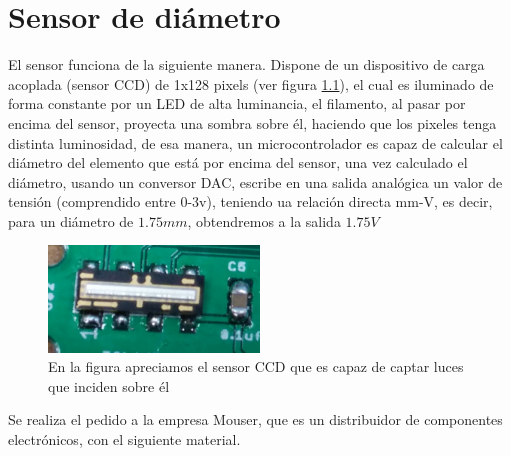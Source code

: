\chapter{Sensor de diámetro}
\label{ane:sensor}

El sensor funciona de la siguiente manera. Dispone de un dispositivo de carga acoplada (sensor CCD) de 1x128 pixels (ver figura \ref{fig:sens_CCD}), el cual es iluminado de forma constante por un LED de alta luminancia, el filamento, al pasar por encima del sensor, proyecta una sombra sobre él, haciendo que los pixeles tenga distinta luminosidad, de esa manera, un microcontrolador es capaz de calcular el diámetro del elemento que está por encima del sensor, una vez calculado el diámetro, usando un conversor DAC, escribe en una salida analógica un valor de tensión  (comprendido entre 0-3v), teniendo ua relación directa mm-V, es decir, para un diámetro de $1.75 mm$, obtendremos a la salida $1.75 V$\\
\begin{figure}[H]
    \centering
    \includegraphics[width=0.5\textwidth]{images/sensor/IMG_20150414_135533_.jpg}
    \caption[Sensor CCD lineal.]{En la figura apreciamos el sensor CCD que es capaz de captar luces que inciden sobre él}
    \label{fig:sens_CCD}
\end{figure}

Se realiza el pedido a la empresa Mouser, que es un distribuidor de componentes electrónicos, con el siguiente material.

